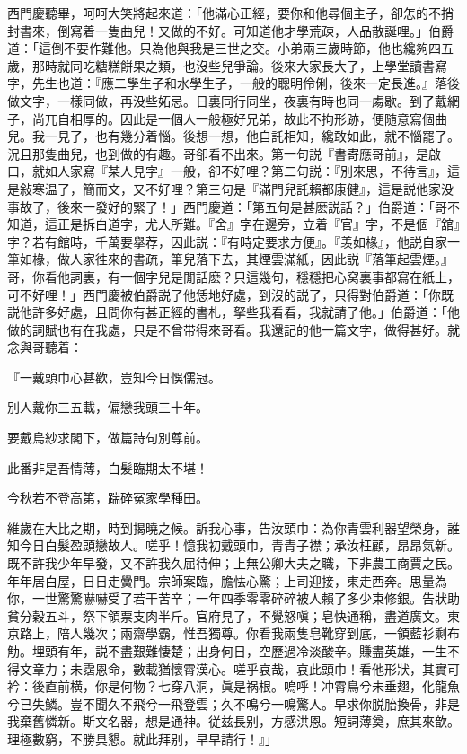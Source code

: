 西門慶聽畢，呵呵大笑將起來道：「他滿心正經，要你和他尋個主子，卻怎的不捎封書來，倒寫着一隻曲兒！又做的不好。可知道他才學荒疎，人品散誕哩。」伯爵道：「這倒不要作難他。只為他與我是三世之交。小弟兩三歲時節，他也纔夠四五歲，那時就同吃糖糕餅果之類，也沒些兒爭論。後來大家長大了，上學堂讀書寫字，先生也道：『應二學生子和水學生子，一般的聰明伶俐，後來一定長進。』落後做文字，一樣同做，再没些妬忌。日裏同行同坐，夜裏有時也同一䖏歇。到了戴網子，尚兀自相厚的。因此是一個人一般極好兄弟，故此不拘形跡，便随意寫個曲兒。我一見了，也有幾分着惱。後想一想，他自託相知，纔敢如此，就不惱罷了。況且那隻曲兒，也到做的有趣。哥卻看不出來。第一句説『書寄應哥前』，是啟口，就如人家寫『某人見字』一般，卻不好哩？第二句説：『別來思，不待言』，這是敍寒温了，簡而文，又不好哩？第三句是『滿門兒託賴都康健』，這是説他家没事故了，後來一發好的緊了！」西門慶道：「第五句是甚麽説話？」伯爵道：「哥不知道，這正是拆白道字，尤人所難。『舍』字在邊旁，立着『官』字，不是個『舘』字？若有館時，千萬要擧荐，因此説：『有時定要求方便』。『羡如椽』，他説自家一筆如椽，做人家徃來的書疏，筆兒落下去，其煙雲滿紙，因此説『落筆起雲煙。』哥，你看他詞裏，有一個字兒是閒話麽？只這幾句，穩穩把心窝裏事都寫在紙上，可不好哩！」西門慶被伯爵説了他恁地好處，到沒的説了，只得對伯爵道：「你既説他許多好處，且問你有甚正經的書札，拏些我看看，我就請了他。」伯爵道：「他做的詞賦也有在我處，只是不曾带得來哥看。我還記的他一篇文字，做得甚好。就念與哥聽着：

\begin{myquote}
『一戴頭巾心甚歡，豈知今日悞儒冠。

別人戴你三五載，偏戀我頭三十年。

要戴烏紗求閣下，做篇詩句別尊前。

此番非是吾情薄，白髮臨期太不堪！

今秋若不登高第，踹碎冤家學種田。
\end{myquote}

\begin{myquote}
維歲在大比之期，時到揭曉之候。訴我心事，告汝頭巾：為你青雲利器望榮身，誰知今日白髮盈頭戀故人。嗟乎！憶我初戴頭巾，青青子襟；承汝枉顧，昂昂氣新。既不許我少年早發，又不許我久屈待伸；上無公卿大夫之職，下非農工商賈之民。年年居白屋，日日走黌門。宗師案臨，膽怯心驚；上司迎接，東走西奔。思量為你，一世驚驚嚇嚇受了若干苦辛；一年四季零零碎碎被人賴了多少束修銀。告狀助貧分穀五斗，祭下領票支肉半斤。官府見了，不覺怒嗔；皂快通稱，盡道廣文。東京路上，陪人幾次；兩齋學霸，惟吾獨尊。你看我兩隻皂靴穿到底，一領藍衫剩布觔。埋頭有年，説不盡艱難悽楚；出身何日，空歷過冷淡酸辛。賺盡英雄，一生不得文章力；未霑恩命，數載猶懷霄漢心。嗟乎哀哉，哀此頭巾！看他形狀，其實可衿：後直前横，你是何物？七穿八洞，眞是祸根。嗚呼！冲霄鳥兮未垂翅，化龍魚兮已失鱗。豈不聞久不飛兮一飛登雲；久不鳴兮一鳴驚人。早求你脱胎換骨，非是我棄舊憐新。斯文名器，想是通神。従兹長别，方感洪恩。短詞薄奠，庶其來歆。理極數窮，不勝具懇。就此拜别，早早請行！』」
\end{myquote}

